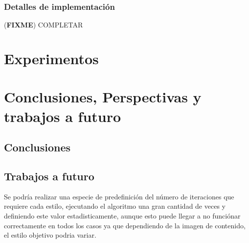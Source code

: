\documentclass[a4paper,11pt,spanish]{book}
\newcommand*{\FIXME}[1]{{(\textbf{FIXME}) {#1}}}
\begin{document}
    \subsection{Detalles de implementación}
      \FIXME{COMPLETAR}

\chapter{Experimentos}

\chapter{Conclusiones, Perspectivas y trabajos a futuro}
  \section{Conclusiones}
  \section{Trabajos a futuro}
    Se podría realizar una especie de predefinición del número de iteraciones que requiere cada estilo, ejecutando el algoritmo una gran cantidad de veces y definiendo este valor 
    estadisticamente, aunque esto puede llegar a no funciónar correctamente en todos los casos ya que dependiendo de la imagen de contenido, el estilo objetivo podria variar.
\printindex
\end{document}
